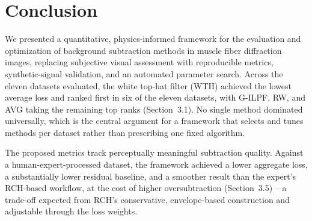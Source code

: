 \documentclass[iucr]{iucrjournals}
\begin{document}


\section{Conclusion} 

We presented a quantitative, physics-informed framework for the evaluation and optimization of background subtraction methods in muscle fiber diffraction images, replacing subjective visual assessment with reproducible metrics, synthetic-signal validation, and an automated parameter search. Across the eleven datasets evaluated, the white top-hat filter (WTH) achieved the lowest average loss and ranked first in six of the eleven datasets, with G-ILPF, RW, and AVG taking the remaining top ranks (Section~3.1). No single method dominated universally, which is the central argument for a framework that selects and tunes methods per dataset rather than prescribing one fixed algorithm.

The proposed metrics track perceptually meaningful subtraction quality. Against a human-expert-processed dataset, the framework achieved a lower aggregate loss, a substantially lower residual baseline, and a smoother result than the expert's RCH-based workflow, at the cost of higher oversubtraction (Section~3.5) -- a trade-off expected from RCH's conservative, envelope-based construction and adjustable through the loss weights.

\end{document}
